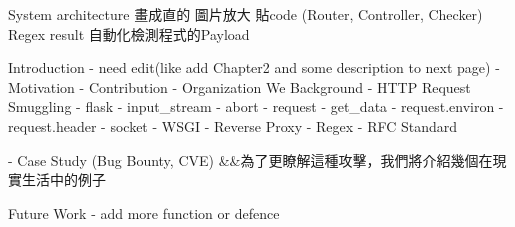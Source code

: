 System architecture 畫成直的
圖片放大
貼code (Router, Controller, Checker)
Regex result
自動化檢測程式的Payload 

Introduction
- need edit(like add Chapter2 and some description to next page)
- Motivation
- Contribution
- Organization
We 
Background
- HTTP Request Smuggling
- flask 
  - input\_stream
  - abort
  - request
  - get\_data
  - request.environ
  - request.header
- socket
- WSGI
- Reverse Proxy
- Regex
- RFC Standard


- Case Study (Bug Bounty, CVE) &&為了更瞭解這種攻擊，我們將介紹幾個在現實生活中的例子

Future Work
- add more function or defence

\begin{table}[htbp]
\centering
\caption{Comparison of related ICS security research and the proposed method.}
\label{tab:comparison}
\end{table}

